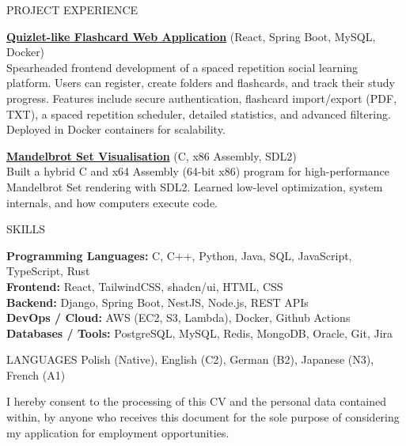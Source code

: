 \documentclass{resume} %
\begin{document}
\begin{rSection}{PROJECT EXPERIENCE}
\item \textbf{\href{https://github.com/Kerciu/flashcard-webapp}{Quizlet-like Flashcard Web Application}} {(React, Spring Boot, MySQL, Docker)}\\
Spearheaded frontend development of a spaced repetition social learning platform. Users can register, create folders and flashcards, and track their study progress. Features include secure authentication, flashcard import/export (PDF, TXT), a spaced repetition scheduler, detailed statistics, and advanced filtering. Deployed in Docker containers for scalability.

\item \textbf {\href{https://github.com/Kerciu/mandelbrot-set-x64-c}{Mandelbrot Set Visualisation}} {(C, x86 Assembly, SDL2)}\\
Built a hybrid C and x64 Assembly (64-bit x86) program for high-performance Mandelbrot Set rendering with SDL2. Learned low-level optimization, system internals, and how computers execute code.


\end{rSection} 


\begin{rSection}{SKILLS}

\textbf{Programming Languages:} C, C++, Python, Java, SQL, JavaScript, TypeScript, Rust \\
\textbf{Frontend:} React, TailwindCSS, shadcn/ui, HTML, CSS \\
\textbf{Backend:} Django, Spring Boot, NestJS, Node.js, REST APIs \\
\textbf{DevOps / Cloud:} AWS (EC2, S3, Lambda), Docker, Github Actions \\
\textbf{Databases / Tools:} PostgreSQL, MySQL, Redis, MongoDB, Oracle, Git, Jira

\end{rSection} 

\begin{rSection}{LANGUAGES}
    Polish (Native), English (C2), German (B2), Japanese (N3), French (A1)
\end{rSection}


\begin{center}
\textcolor[rgb]{0.5,0.5,0.5}{\small I hereby consent to the processing of this CV and the personal data contained within, by anyone who receives this document for the sole purpose of considering my application for employment opportunities.}
\end{center}
\end{document}
